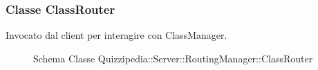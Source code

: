 \subsubsection{Classe ClassRouter}
Invocato dal client per interagire con ClassManager.
\begin{figure}[H]
\centering
\noindent{}
\caption[Schema Classe ClassRouter]{Schema Classe Quizzipedia::Server::RoutingManager::ClassRouter}
\end{figure}
